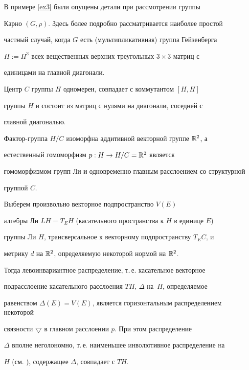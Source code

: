 \begin{exams}


\label{ex4}


В примере \ref{ex3} были опущены детали при рассмотрении группы 


Карно $(G,\rho)$. Здесь более подробно рассматривается наиболее простой


частный случай, когда $G$ есть (мультипликативная) группа Гейзенберга


$H:=H^{3}$ всех вещественных верхних треугольных $3\times 3$-матриц с


единицами на главной диагонали.





Центр $C$ группы $H$ одномерен, совпадает с коммутантом $[H,H]$


группы $H$ и состоит из матриц с нулями на диагонали, соседней с


главной диагональю.


Фактор-группа $H/C$ изоморфна аддитивной векторной группе $\Bbb{R}^{2}$, а


естественный гомоморфизм $p:H \rightarrow H/C = \Bbb{R}^{2}$ является


гомоморфизмом групп Ли и одновременно главным расслоением со структурной


группой $C$.





Выберем произвольно векторное подпространство $V(E)$


алгебры Ли $LH=T_{E}H$ (касательного пространства к $H$ в единице $E$)


группы Ли $H$, трансверсальное к векторному подпространству $T_{E}C$, и


метрику $d$ на $\Bbb{R}^{2}$, определяемую некоторой нормой на $\Bbb{R}^{2}$.


Тогда левоинвариантное распределение, т.\,е. касательное векторное


подрасслоение касательного расслоения $TH$, $\Delta$ на~$H$, определяемое


равенством $\Delta(E)=V(E)$, является горизонтальным распределением некоторой


связности $\bigtriangledown$ в главном расслоении $p$. При этом распределение


$\Delta$ вполне неголономно, т.\,е. наименьшее инволютивное распределение на


$H$ (см. \cite{KN}), содержащее $\Delta$, совпадает с $TH$.






\end{exams}
